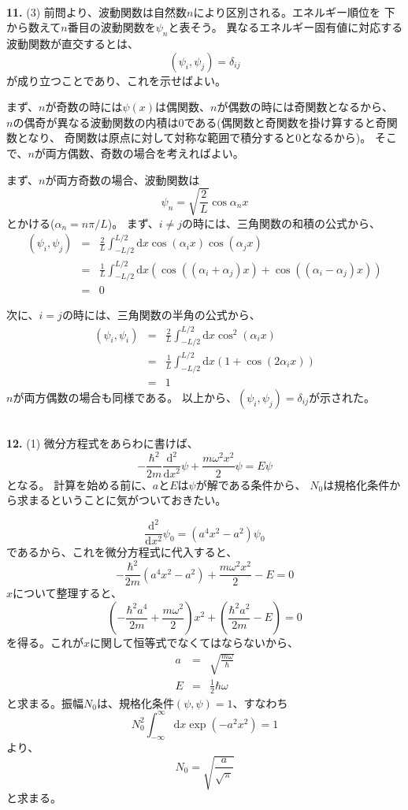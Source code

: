 \documentclass{jarticle}
\newcommand{\diff}{\mathrm d}
\newcommand{\ans}[2]{\noindent\\ {\bf \large #1.} (#2)}
\begin{document}
\ans{11}{3}
前問より、波動関数は自然数$n$により区別される。エネルギー順位を
下から数えて$n$番目の波動関数を$\psi_n$と表そう。
異なるエネルギー固有値に対応する波動関数が直交するとは、
\begin{equation}
  (\psi_i,\psi_j) = \delta_{ij}
\end{equation}
が成り立つことであり、これを示せばよい。

まず、$n$が奇数の時には$\psi(x)$は偶関数、$n$が偶数の時には奇関数となるから、
$n$の偶奇が異なる波動関数の内積は$0$である(偶関数と奇関数を掛け算すると奇関数となり、
奇関数は原点に対して対称な範囲で積分すると$0$となるから)。
そこで、$n$が両方偶数、奇数の場合を考えればよい。

まず、$n$が両方奇数の場合、波動関数は
\begin{equation}
  \psi_n = \sqrt{\frac{2}{L}} \cos \alpha_n x
\end{equation}
とかける($\alpha_n = n \pi/L$)。
まず、$i \neq j$の時には、三角関数の和積の公式から、
\begin{eqnarray*}
  (\psi_i,\psi_j)& =& \frac{2}{L} \int_{-L/2}^{L/2} \!\!\! \diff x  \cos{(\alpha_i x)}  \cos{(\alpha_j x)}  \\
  &=& \frac{1}{L} \int_{-L/2}^{L/2} \!\!\! \diff x \left( \cos{((\alpha_i+\alpha_j) x)}  + \cos{((\alpha_i-\alpha_j) x)} \right)\\
  &=& 0
\end{eqnarray*}

次に、$i = j$の時には、三角関数の半角の公式から、
\begin{eqnarray*}
  (\psi_i,\psi_i)& =& \frac{2}{L} \int_{-L/2}^{L/2} \!\!\! \diff x  \cos^2{(\alpha_i x)}  \\
  &=& \frac{1}{L} \int_{-L/2}^{L/2} \!\!\! \diff x \left(
  1 +  \cos{(2\alpha_i x)}
  \right) \\
  &=& 1
\end{eqnarray*}
$n$が両方偶数の場合も同様である。
以上から、$(\psi_i,\psi_j) = \delta_{ij}$が示された。

\ans{12}{1}
微分方程式をあらわに書けば、
$$
  -\frac{\hbar^2}{2m} \frac{\diff^2}{\diff x^2} \psi  + \frac{m \omega^2 x^2}{2} \psi = E \psi
$$
となる。
計算を始める前に、$a$と$E$は$\psi$が解である条件から、
$N_0$は規格化条件から求まるということに気がついておきたい。

$$
  \frac{\diff^2}{\diff x^2} \psi_0 = (a^4x^2-a^2) \psi_0
$$
であるから、これを微分方程式に代入すると、
$$
  -\frac{\hbar^2}{2m} (a^4 x^2 -a^2)  + \frac{m \omega^2 x^2}{2} - E = 0
$$
$x$について整理すると、
$$
  \left( -\frac{\hbar^2 a^4}{2m}  + \frac{m \omega^2 }{2} \right)x^2 +
  \left( \frac{\hbar^2a^2}{2m} -E \right) = 0
$$
を得る。これが$x$に関して恒等式でなくてはならないから、
\begin{eqnarray*}
  a &=& \sqrt{\frac{m\omega}{\hbar}} \\
  E &=& \frac{1}{2} \hbar \omega
\end{eqnarray*}
と求まる。振幅$N_0$は、規格化条件$(\psi,\psi)=1$、すなわち
$$
  N_0^2 \int_{-\infty}^{\infty} \!\!\! \diff x  \exp(-a^2 x^2) = 1
$$
より、
$$
  N_0 = \sqrt{\frac{a}{\sqrt{\pi}}}
$$
と求まる。
\end{document}
